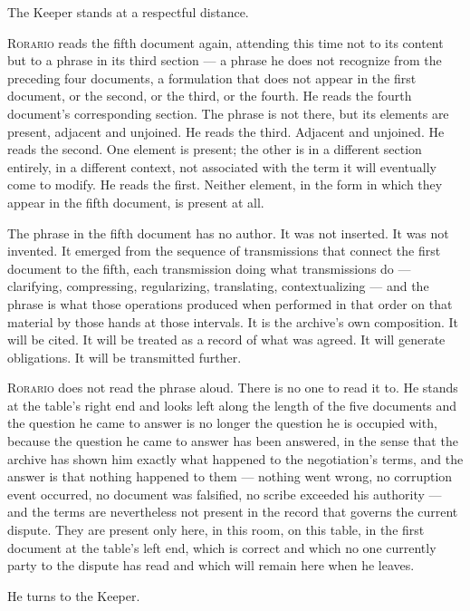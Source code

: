 \documentclass[12pt, oneside]{article}
\newenvironment{action}{%
  \vspace{0.6em}%
  \noindent\ignorespaces%
}{%
  \par\vspace{0.6em}%
}
\begin{document}
\begin{action}
The Keeper stands at a respectful distance.

\textsc{Rorario} reads the fifth document again, attending this time not to its content but to a phrase in its third section --- a phrase he does not recognize from the preceding four documents, a formulation that does not appear in the first document, or the second, or the third, or the fourth. He reads the fourth document's corresponding section. The phrase is not there, but its elements are present, adjacent and unjoined. He reads the third. Adjacent and unjoined. He reads the second. One element is present; the other is in a different section entirely, in a different context, not associated with the term it will eventually come to modify. He reads the first. Neither element, in the form in which they appear in the fifth document, is present at all.

The phrase in the fifth document has no author. It was not inserted. It was not invented. It emerged from the sequence of transmissions that connect the first document to the fifth, each transmission doing what transmissions do --- clarifying, compressing, regularizing, translating, contextualizing --- and the phrase is what those operations produced when performed in that order on that material by those hands at those intervals. It is the archive's own composition. It will be cited. It will be treated as a record of what was agreed. It will generate obligations. It will be transmitted further.

\textsc{Rorario} does not read the phrase aloud. There is no one to read it to. He stands at the table's right end and looks left along the length of the five documents and the question he came to answer is no longer the question he is occupied with, because the question he came to answer has been answered, in the sense that the archive has shown him exactly what happened to the negotiation's terms, and the answer is that nothing happened to them --- nothing went wrong, no corruption event occurred, no document was falsified, no scribe exceeded his authority --- and the terms are nevertheless not present in the record that governs the current dispute. They are present only here, in this room, on this table, in the first document at the table's left end, which is correct and which no one currently party to the dispute has read and which will remain here when he leaves.
\end{action}

\begin{action}
He turns to the Keeper.
\end{action}
\end{document}
